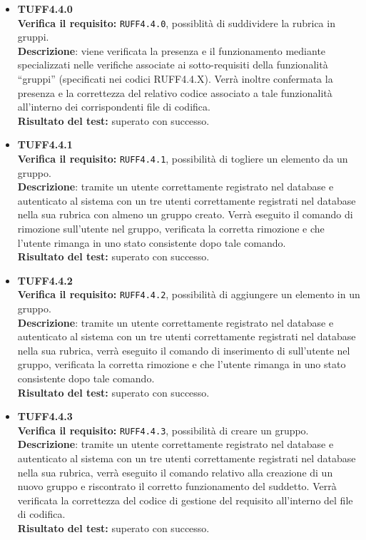 \begin{itemize}
\item \textbf{TUFF4.4.0}\\
\textbf{Verifica il requisito:} \texttt{RUFF4.4.0}, possiblità di suddividere la rubrica in gruppi.\\
\textbf{Descrizione}: viene verificata la presenza e il funzionamento mediante  specializzati nelle verifiche associate ai sotto-requisiti della funzionalità ``gruppi'' (specificati nei codici RUFF4.4.X). Verrà inoltre confermata la presenza e la correttezza del relativo codice associato a tale funzionalità all'interno dei corrispondenti file di codifica.\\
\textbf{Risultato del test:} superato con successo.

\item \textbf{TUFF4.4.1}\\
\textbf{Verifica il requisito:} \texttt{RUFF4.4.1}, possibilità di togliere un elemento da un gruppo.\\
\textbf{Descrizione}: tramite un utente  correttamente registrato nel database e autenticato al sistema con un tre utenti  correttamente registrati nel database nella sua rubrica con almeno un gruppo creato. Verrà eseguito il comando di rimozione sull'utente nel gruppo, verificata la corretta rimozione e che l'utente rimanga in uno stato consistente dopo tale comando.\\
\textbf{Risultato del test:} superato con successo.

\item \textbf{TUFF4.4.2}\\
\textbf{Verifica il requisito:} \texttt{RUFF4.4.2}, possibilità di aggiungere un elemento in un gruppo.\\
\textbf{Descrizione}: tramite un utente  correttamente registrato nel database e autenticato al sistema con un tre utenti  correttamente registrati nel database nella sua rubrica, verrà eseguito il comando di inserimento di sull'utente nel gruppo, verificata la corretta rimozione e che l'utente rimanga in uno stato consistente dopo tale comando.\\
\textbf{Risultato del test:} superato con successo.

\item \textbf{TUFF4.4.3}\\
\textbf{Verifica il requisito:} \texttt{RUFF4.4.3}, possibilità di creare un gruppo.\\
\textbf{Descrizione}: tramite un utente  correttamente registrato nel database e autenticato al sistema con un tre utenti  correttamente registrati nel database nella sua rubrica, verrà eseguito il comando relativo alla creazione di un nuovo gruppo e riscontrato il corretto funzionamento del suddetto. Verrà verificata la correttezza del codice di gestione del requisito all'interno del file di codifica.\\
\textbf{Risultato del test:} superato con successo.


\end{itemize}

